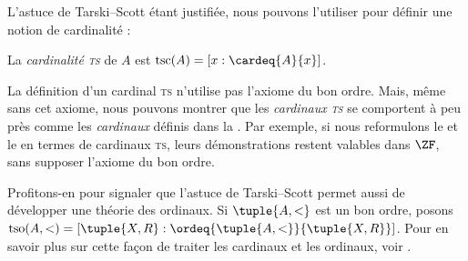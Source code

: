 \documentclass[../../../include/open-logic-section]{subfiles}
\begin{document}
L'astuce de Tarski--Scott étant justifiée,
nous pouvons l'utiliser pour définir
une notion de cardinalité :

\begin{defn}
La \emph{cardinalité \textsc{ts}} de $A$ est
$\text{tsc}(A) = [x : \cardeq{A}{x}]$.
\end{defn}

La définition d'un cardinal \textsc{ts}
n'utilise pas l'axiome du bon ordre.
Mais, même sans cet axiome, nous pouvons
montrer que les \emph{cardinaux \textsc{ts}}
se comportent à peu près comme les
\emph{cardinaux} définis dans la
.
Par exemple, si nous reformulons
le 
et
le 
en termes de cardinaux \textsc{ts},
leurs démonstrations restent valables
dans $\ZF$, sans supposer l'axiome du
bon ordre.

Profitons-en pour signaler que l'astuce
de Tarski--Scott permet aussi de développer
une théorie des ordinaux. Si
$\tuple{A, <}$ est un bon ordre, posons
$\text{tso}(A, <) =
[\tuple{X, R} :
\ordeq{\tuple{A, <}}{\tuple{X, R}}]$.
Pour en savoir plus sur cette façon de
traiter les cardinaux et les ordinaux,
voir \citet[chs.~9--12]{Potter2004}.
\end{document}
